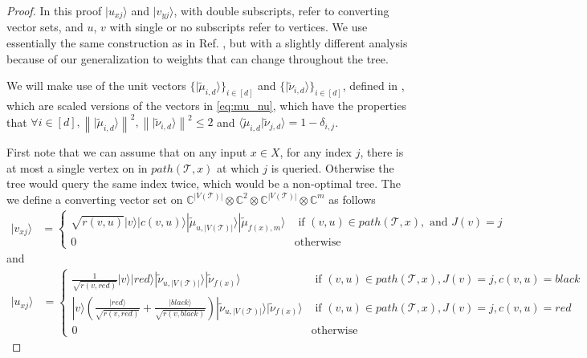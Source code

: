 \documentclass[cleveref, autoref, thm-restate,11pt]{article}
\theoremstyle{definition}
\newcommand{\sop}[1]{{\mathcal #1}}
\newcommand{\ket}[1]{|#1\rangle}
\newcommand{\braket}[2]{\langle{#1}|{#2}\rangle}
\begin{document}
\begin{proof}
In this proof $\ket{u_{xj}}$ and $\ket{v_{yj}}$, with double subscripts, refer to converting
vector sets, and $u$, $v$ with single or no subscripts refer to vertices.
We use essentially the same
construction as in Ref. \cite{beigiQuantumSpeedupBased2019}, but with a slightly
different analysis because
of our generalization to weights that can change throughout the tree.

We will make use of the unit vectors 
$\{\ket{\tilde{\mu}_{i,d}}\}_{i\in [d]}$ and 
$\{\ket{\tilde{\nu}_{i,d}}\}_{i\in [d]}$, defined in 
\cite{beigiQuantumSpeedupBased2019}, which are scaled versions of the vectors in 
\cref{eq:mu_nu}, which have the properties that 
$\forall i\in [d],\left\|\ket{\tilde{\mu}_{i,d}}\right\|^2,\left\|\ket{\tilde{\nu}_{i,d}}\right\|^2\leq 2$ and $\braket{\tilde{\mu}_{i,d}}{\tilde{\nu}_{j,d}}=1-\delta_{i,j}$.

First note that we can assume that on
any input $x\in X$, for any index $j$, there is at most a single vertex on in $path(\sop T,x)$ at which $j$ is queried. Otherwise
the tree would query the same index twice, which would be a non-optimal tree.
 The we define a converting vector set on 
 $\mathbb{C}^{|V(\sop T)|}\otimes \mathbb{C}^{2}\otimes\mathbb{C}^{|V(\sop T)|}
 \otimes\mathbb{C}^{m}$ as follows
 \begin{align}
 \label{eq:pos_wt_witness_DT}
 \ket{v_{xj}}&=
 \begin{cases}
 \sqrt{r(v,u)}\ket{v}\ket{c(v,u)}\ket{\tilde{\mu}_{u,|V(\sop T)|}}\ket{\tilde{\mu}_{f(x),m}} &\textrm{ if } (v,u)\in path(\sop T,x), \textrm{ and } J(v)=j\\
 0&\textrm{otherwise}
 \end{cases}
 \end{align}
 and
 \begin{align}
  \label{eq:neg_wt_witness_DT}
 \ket{u_{xj}}&=
 \begin{cases}
 \frac{1}{\sqrt{r(v,red)}}\ket{v}\ket{red}\ket{\tilde{\nu}_{u,|V(\sop T)|}}\ket{\tilde{\nu}_{f(x)}} &\textrm{ if } (v,u)\in path(\sop T,x), J(v)=j,c(v,u)=black\\
 \ket{v}\left(\frac{\ket{red}}{\sqrt{r(v,red)}}+\frac{\ket{black}}{\sqrt{r(v,black)}}\right)\ket{\tilde{\nu}_{u,|V(\sop T)|}}\ket{\tilde{\nu}_{f(x)}} &\textrm{ if } (v,u)\in path(\sop T,x), J(v)=j,c(v,u)=red\\
 0&\textrm{otherwise}
 \end{cases}
 \end{align}


\end{proof}
\end{document}
